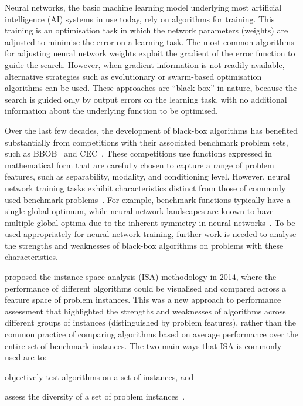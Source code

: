 \documentclass[acmsmall,screen,review,anonymous]{acmart}
\begin{document}
Neural networks, the basic machine learning model underlying most artificial intelligence (AI) systems in use today, rely on algorithms for training. This training is an optimisation task in which the network parameters (weights) are adjusted to minimise the error on a learning task. The most common algorithms for adjusting neural network weights exploit the gradient of the error function to guide the search. However, when gradient information is not readily available, alternative strategies such as evolutionary or swarm-based optimisation algorithms can be used. These approaches are ``black-box'' in nature, because the search is guided only by output errors on the learning task, with no additional information about the underlying function to be optimised.   

Over the last few decades, the development of black-box algorithms has benefited substantially from competitions with their associated benchmark problem sets, such as BBOB~\cite{BBOB} and CEC~\cite{CEC}. These competitions use functions expressed in mathematical form that are carefully chosen to capture a range of problem features, such as separability, modality, and conditioning level. However, neural network training tasks exhibit characteristics distinct from those of commonly used benchmark problems~\cite{Malan2025}. For example, benchmark functions typically have a single global optimum, while neural network landscapes are known to have multiple global optima due to the inherent symmetry in neural networks~\cite{BOSM2019Thesis}. To be used appropriately for neural network training, further work is needed to analyse the strengths and weaknesses of black-box algorithms on problems with these characteristics.

\citet{SmithMiles2014} proposed the instance space analysis (ISA) methodology in 2014, where the performance of different algorithms could be visualised and compared across a feature space of problem instances. This was a new approach to performance assessment that highlighted the strengths and weaknesses of algorithms across different groups of instances (distinguished by problem features), rather than the common practice of comparing algorithms based on average performance over the entire set of benchmark instances. The two main ways that ISA is commonly used are to:
\begin{inparaenum}[(a)]
    \item objectively test algorithms on a set of instances, and
    \item assess the diversity of a set of problem instances~\cite{SmithMiles2022}.
\end{inparaenum}
\end{document}
